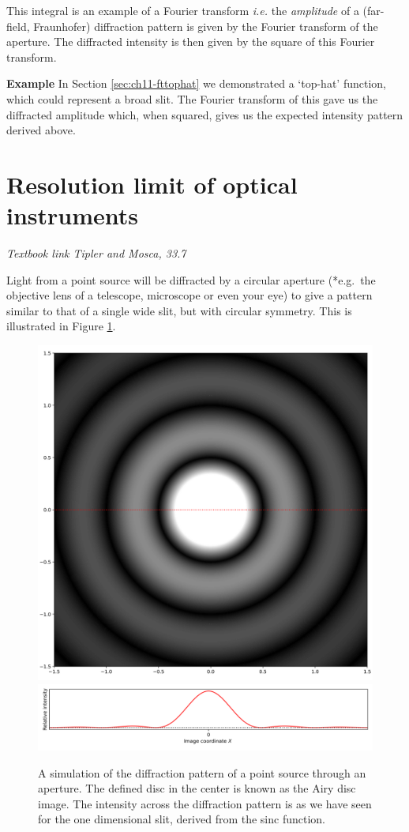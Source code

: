 \documentclass[
]{book}
\begin{document}
This integral is an example of a Fourier transform \emph{i.e.} the \emph{amplitude} of a (far-field, Fraunhofer) diffraction pattern is given by the Fourier transform of the aperture. The diffracted intensity is then given by the square of this Fourier transform.

\textbf{Example} In Section \ref{sec:ch11-fttophat} we demonstrated a `top-hat' function, which could represent a broad slit. The Fourier transform of this gave us the diffracted amplitude which, when squared, gives us the expected intensity pattern derived above.

\hypertarget{sec:ch13-resolutionlimit}{%
\section{Resolution limit of optical instruments}\label{sec:ch13-resolutionlimit}}

\emph{Textbook link Tipler and Mosca, 33.7}

Light from a point source will be diffracted by a circular aperture (*e.g.~the objective lens of a telescope, microscope or even your eye) to give a pattern similar to that of a single wide slit, but with circular symmetry. This is illustrated in Figure \ref{fig:ch13-circulardiffraction1}.

\begin{figure}

{\centering \includegraphics[width=0.7\linewidth]{visualisations/ch13-singlesource-diffraction} \includegraphics[width=0.7\linewidth]{visualisations/ch13-singlesource-diffraction-b} 

}

\caption{A simulation of the diffraction pattern of a point source through an aperture. The defined disc in the center is known as the Airy disc image. The intensity across the diffraction pattern is as we have seen for the one dimensional slit, derived from the sinc function.}\label{fig:ch13-circulardiffraction1}
\end{figure}
\end{document}
